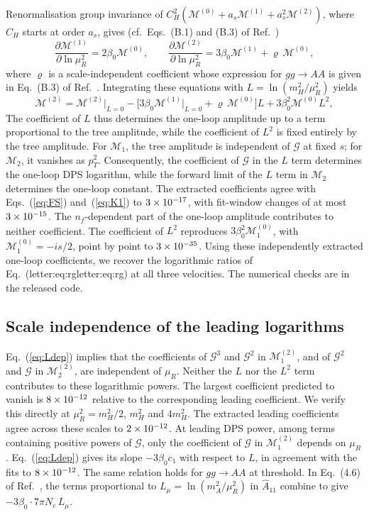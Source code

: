 \documentclass[%
 onecolumn,
 superscriptaddress,
 preprintnumbers,
 nofootinbib,
 amsmath,amssymb,
 aps,
 prl,
]{revtex4-2}
\newcommand{\G}{\mathcal G}
\newcommand{\M}{\mathcal M}
\newcommand{\Lref}[1]{\ifcsname letter:#1\endcsname\csname letter:#1\endcsname\else\errmessage{The Letter has no label #1 (run letter_labels.py)}\fi}
\begin{document}
Renormalisation group invariance of
$C_H^2(\M^{(0)}+a_s\M^{(1)}+a_s^2\M^{(2)})$,
where $C_H$ starts at order $a_s$, gives
(cf.\ Eqs.~(B.1) and (B.3) of Ref.~\cite{P1})
\begin{equation}
\frac{\partial\M^{(1)}}{\partial\ln\mu_R^2}=2\beta_0\M^{(0)},\qquad
\frac{\partial\M^{(2)}}{\partial\ln\mu_R^2}=3\beta_0\M^{(1)}+\varrho\,\M^{(0)},
\end{equation}
where $\varrho$ is a scale-independent coefficient
whose expression for $gg\to AA$ is given in
Eq.~(B.3) of Ref.~\cite{P1}.
Integrating these equations with
$L=\ln(m_H^2/\mu_R^2)$ yields
\begin{equation}
\M^{(2)}=\M^{(2)}\big|_{L=0}
-\big[3\beta_0\M^{(1)}\big|_{L=0}
+\varrho\,\M^{(0)}\big]L
+3\beta_0^2\M^{(0)}L^2,
\label{eq:Ldep}
\end{equation}
%
The coefficient of $L$ thus determines
the one-loop amplitude up to a term
proportional to the tree amplitude, while
the coefficient of $L^2$ is fixed entirely
by the tree amplitude. For $\M_1$, the
tree amplitude is independent of $\G$
at fixed $s$; for $\M_2$, it vanishes as
$p_T^2$. Consequently, the coefficient
of $\G$ in the $L$ term determines the
one-loop DPS logarithm, while the forward
limit of the $L$ term in $\M_2$ determines
the one-loop constant.
%
The extracted coefficients agree with
Eqs.~(\ref{eq:FS}) and~(\ref{eq:K1})
to $3\times10^{-17}$, with fit-window
changes of at most $3\times10^{-15}$.
The $n_f$-dependent part of the one-loop
amplitude contributes to neither coefficient.
The coefficient of $L^2$ reproduces
$3\beta_0^2\M_1^{(0)}$, with
$\M_1^{(0)}=-is/2$, point by point
to $3\times10^{-35}$.
%
Using these independently extracted one-loop
coefficients, we recover the logarithmic
ratios of Eq.~(\Lref{eq:rg}) at all three
velocities. The numerical checks are
in the released code.

\subsection{Scale independence of the leading logarithms}
\label{sec:scale}

Eq.~(\ref{eq:Ldep}) implies that
the coefficients of $\G^3$ and $\G^2$
in $\M_1^{(2)}$, and of $\G^2$ and
$\G$ in $\M_2^{(2)}$, are independent
of $\mu_R$. Neither the $L$ nor the
$L^2$ term contributes to these
logarithmic powers. The largest
coefficient predicted to vanish is
$8\times10^{-12}$ relative to the
corresponding leading coefficient.
%
We verify this directly at
$\mu_R^2=m_H^2/2$, $m_H^2$ and $4m_H^2$.
The extracted leading coefficients
agree across these scales to
$2\times10^{-12}$.
%
At leading DPS power, among terms containing
positive powers of $\G$, only the coefficient
of $\G$ in $\M_1^{(2)}$ depends on $\mu_R$.
Eq.~(\ref{eq:Ldep}) gives its slope
$-3\beta_0c_1$ with respect to $L$,
in agreement with the fits to $8\times10^{-12}$.
%
The same relation holds for $gg\to AA$
at threshold. In Eq.~(4.6) of
Ref.~\cite{P1}, the terms proportional
to $L_\mu=\ln(m_A^2/\mu_R^2)$ in
$\widehat A_{11}$ combine to give
$-3\beta_0\cdot7\pi N_c\,L_\mu$.
\end{document}
